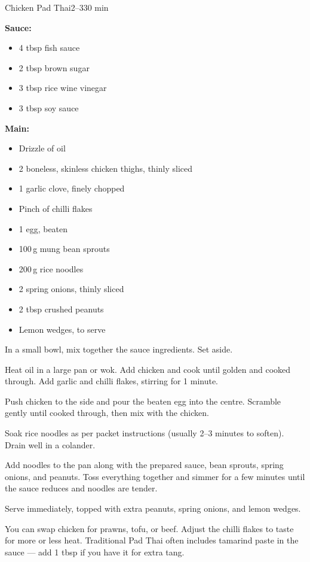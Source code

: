 \begin{recipebox}{Chicken Pad Thai}{2--3}{30 min}
\begin{ingredients}
  \item \textbf{Sauce:}
  \begin{itemize}[leftmargin=2em]
    \item 4 tbsp fish sauce
    \item 2 tbsp brown sugar
    \item 3 tbsp rice wine vinegar
    \item 3 tbsp soy sauce
  \end{itemize}
  \item \textbf{Main:}
  \begin{itemize}[leftmargin=2em]
    \item Drizzle of oil
    \item 2 boneless, skinless chicken thighs, thinly sliced
    \item 1 garlic clove, finely chopped
    \item Pinch of chilli flakes
    \item 1 egg, beaten
    \item 100\,g mung bean sprouts
    \item 200\,g rice noodles
    \item 2 spring onions, thinly sliced
    \item 2 tbsp crushed peanuts
    \item Lemon wedges, to serve
  \end{itemize}
\end{ingredients}

\begin{method}
  \item In a small bowl, mix together the sauce ingredients. Set aside.
  \item Heat oil in a large pan or wok. Add chicken and cook until golden and cooked through. Add garlic and chilli flakes, stirring for 1 minute.  
  \item Push chicken to the side and pour the beaten egg into the centre. Scramble gently until cooked through, then mix with the chicken.  
  \item Soak rice noodles as per packet instructions (usually 2–3 minutes to soften). Drain well in a colander.  
  \item Add noodles to the pan along with the prepared sauce, bean sprouts, spring onions, and peanuts. Toss everything together and simmer for a few minutes until the sauce reduces and noodles are tender.  
  \item Serve immediately, topped with extra peanuts, spring onions, and lemon wedges.  
\end{method}

\begin{notes}
You can swap chicken for prawns, tofu, or beef.  
Adjust the chilli flakes to taste for more or less heat.  
Traditional Pad Thai often includes tamarind paste in the sauce — add 1 tbsp if you have it for extra tang.  
\end{notes}
\end{recipebox}